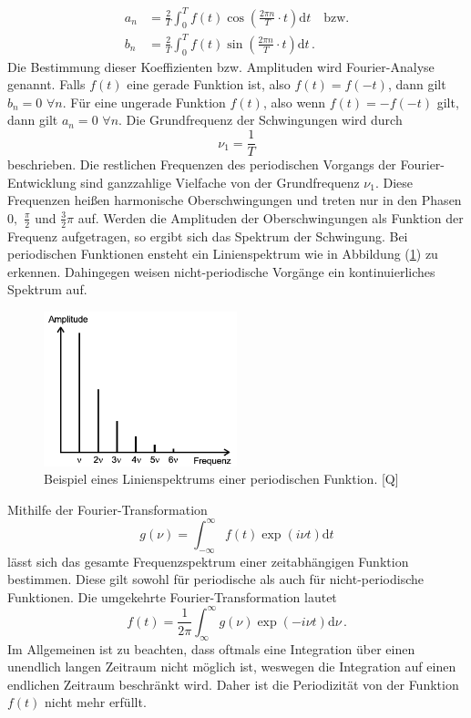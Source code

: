 \begin{align}
    a_n &= \frac{2}{T} \int_{0}^{T}f(t)\cos \left( \frac{2\pi n}{T}\cdot t\right)\text{d}t\quad \text{bzw.} \label{eqn:a_n}\\
    b_n &= \frac{2}{T} \int_{0}^{T}f(t)\sin \left( \frac{2\pi n}{T}\cdot t\right)\text{d}t\,.\label{eqn:b_n}
\end{align}
Die Bestimmung dieser Koeffizienten bzw. Amplituden wird Fourier-Analyse genannt. Falls $f(t)$ eine gerade Funktion ist, also $f(t)=f(-t)$, dann 
gilt $b_n = 0\,\,\forall n$. Für eine ungerade Funktion $f(t)$, also wenn $f(t) = -f(-t)$ gilt, dann gilt $a_n= 0\,\,\forall n$.
Die Grundfrequenz der Schwingungen wird durch
\begin{equation}
    \nu_1=\frac{1}{T}
    \label{eqn:Grundfrequenz}
\end{equation}
beschrieben. Die restlichen Frequenzen des periodischen Vorgangs der Fourier-Entwicklung sind ganzzahlige Vielfache von
der Grundfrequenz $\nu_1$. Diese Frequenzen heißen harmonische Oberschwingungen und treten nur in den Phasen $0,\,\, \frac{\pi}{2}$ und $\frac{3}{2}\pi$
auf. Werden die Amplituden der Oberschwingungen als Funktion der Frequenz aufgetragen, so ergibt sich das Spektrum der Schwingung. Bei periodischen
Funktionen ensteht ein Linienspektrum wie in Abbildung (\ref{fig:Linienspektrum}) zu erkennen. Dahingegen weisen nicht-periodische Vorgänge ein
kontinuierliches Spektrum auf.
\begin{figure}[H]
    \centering
    \includegraphics[width=0.50\textwidth]{Linienspektrum.png}
    \caption{Beispiel eines Linienspektrums einer periodischen Funktion. [Q\cite{anleitungV351}]}
    \label{fig:Linienspektrum}
\end{figure}
Mithilfe der Fourier-Transformation
\begin{equation}
    g(\nu)= \int_{-\infty}^{\infty}f(t)\exp\left(i \nu t\right) \text{d}t
    \label{eqn:FourierTransformation}
\end{equation}
lässt sich das gesamte Frequenzspektrum einer zeitabhängigen Funktion bestimmen. Diese gilt sowohl für periodische als auch für 
nicht-periodische Funktionen. Die umgekehrte Fourier-Transformation lautet
\begin{equation}
    f(t)=\frac{1}{2\pi}\int_{\infty}^{\infty}g(\nu)\exp\left(-i\nu t\right)\text{d}\nu\,.
    \label{eqn:reverseFourierTransformation}
\end{equation}
Im Allgemeinen ist zu beachten, dass oftmals eine Integration über einen unendlich langen Zeitraum nicht möglich ist, weswegen die Integration auf einen endlichen
Zeitraum beschränkt wird. Daher ist die Periodizität von der Funktion $f(t)$ nicht mehr erfüllt.

